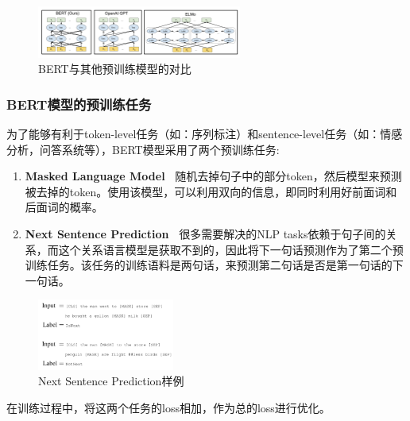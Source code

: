 \documentclass[10pt, a4]{extarticle}
\begin{document}
\begin{figure}[H]
	\centering
	\includegraphics[width=0.6\textwidth]{figure/bert.jpg}
	\caption{BERT与其他预训练模型的对比}
	\label{bert_compare}
\end{figure}
\subsubsection{BERT模型的预训练任务}
为了能够有利于token-level任务（如：序列标注）和sentence-level任务（如：情感分析，问答系统等），BERT模型采用了两个预训练任务:
\begin{enumerate}[fullwidth,itemindent=2em,label=(\arabic*)]
	\item \textbf{Masked Language Model\ }  随机去掉句子中的部分token，然后模型来预测被去掉的token。使用该模型，可以利用双向的信息，即同时利用好前面词和后面词的概率。
	\item \textbf{Next Sentence Prediction\ }  很多需要解决的NLP tasks依赖于句子间的关系，而这个关系语言模型是获取不到的，因此将下一句话预测作为了第二个预训练任务。该任务的训练语料是两句话，来预测第二句话是否是第一句话的下一句话。
\end{enumerate}
\begin{figure}[H]
	\centering
	\includegraphics[width=0.4\textwidth]{figure/next.png}
	\caption{Next Sentence Prediction样例}
	\label{next}
\end{figure}
在训练过程中，将这两个任务的loss相加，作为总的loss进行优化。
\end{document}
